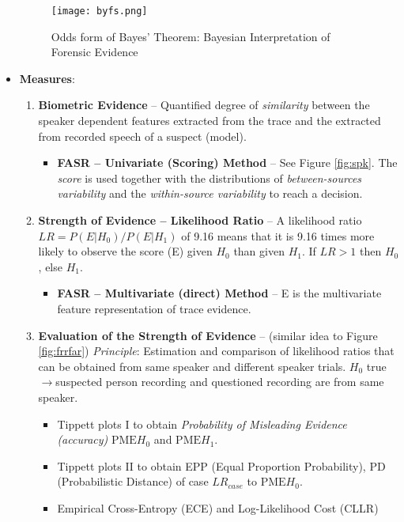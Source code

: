 \documentclass[a4paper]{article}
\begin{document}
\begin{itemize}
          \begin{figure}[htp]
            \centering
              \texttt{[image: byfs.png]}
              \caption{Odds form of Bayes' Theorem: Bayesian Interpretation of Forensic Evidence}
              \label{fig:byfs}
          \end{figure}
        \item \textbf{Measures}:
        \begin{enumerate}
          \item \textbf{Biometric Evidence} -- Quantified degree of \emph{similarity} between the speaker dependent features extracted from the trace and the extracted from recorded speech of a suspect (model).
          \begin{itemize}
            \item \textbf{FASR -- Univariate (Scoring) Method} -- See Figure \ref{fig:spk}. The \emph{score} is used together with the distributions of \emph{between-sources variability} and the \emph{within-source variability} to reach a decision.
          \end{itemize}
          \item \textbf{Strength of Evidence -- Likelihood Ratio} -- A likelihood ratio $LR=P(E|H_0)/P(E|H_1)$ of 9.16 means that it is 9.16 times more likely to observe the score (E) given $H_0$ than given $H_1$. If $LR>1$ then $H_0$, else $H_1$.
          \begin{itemize}
            \item \textbf{FASR -- Multivariate (direct) Method} -- E is the multivariate feature representation of trace evidence.
          \end{itemize}
          \item \textbf{Evaluation of the Strength of Evidence} -- (similar idea to Figure \ref{fig:frrfar}) \emph{Principle}: Estimation and comparison of likelihood ratios that can be obtained from same speaker and different speaker trials. $H_0$ true $\rightarrow$suspected person recording and questioned recording are from same speaker.
          \begin{itemize}
            \item Tippett plots I to obtain \emph{Probability of Misleading Evidence (accuracy)} $\text{PME}H_0$ and $\text{PME}H_1$.
            \item Tippett plots II to obtain EPP (Equal Proportion Probability), PD (Probabilistic Distance) of case $LR_{case}$ to $\text{PME}H_0$.
            \item Empirical Cross-Entropy (ECE) and Log-Likelihood Cost (CLLR) 
          \end{itemize}
        \end{enumerate}
      \end{itemize}
\end{document}
